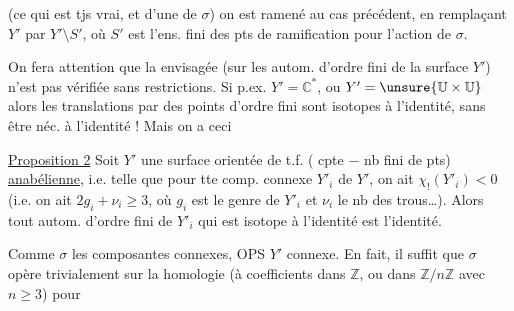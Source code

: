 (ce qui est  tjs vrai, et   d'une  de $\sigma$) on est ramené au cas précédent, en  remplaçant $Y'$ par $Y'\setminus S'$, où $S'$ est l'ens. fini des pts de ramification pour l'action de $\sigma$. 

On fera attention que la   envisagée  (sur les autom. d'ordre fini de la surface $Y'$) n'est pas vérifiée sans restrictions. Si p.ex. $Y'=\mathbb{C}^*$, ou $Y'=\unsure{\mathbb{U}\times\mathbb{U}}$ alors les translations par des points d'ordre fini sont isotopes à l'identité, sans être néc.  à l'identité ! Mais on a ceci

\uline{Proposition 2} Soit $Y'$ une surface orientée de t.f. ( cpte $-$ nb fini de pts) \uline{anabélienne}, i.e. telle que pour tte comp. connexe $Y'_i$ de $Y'$, on ait $\chi_!(Y'_i)<0$ (i.e. on ait $2g_i+\nu_i\geq 3$, où $g_i$ est le genre de $Y'_i$ et $\nu_i$ le nb des trous\ldots). Alors tout autom. \inserted{$\sigma$} d'ordre fini de $Y'_i$ qui est isotope à l'identité est l'identité.

Comme $\sigma$  les composantes connexes, OPS $Y'$ connexe. En fait, il suffit que $\sigma$ opère trivialement sur la homologie  (à coefficients dans $\mathbb{Z}$, ou dans  $\mathbb{Z}/n\mathbb{Z}$ avec $n\geq3$) pour
